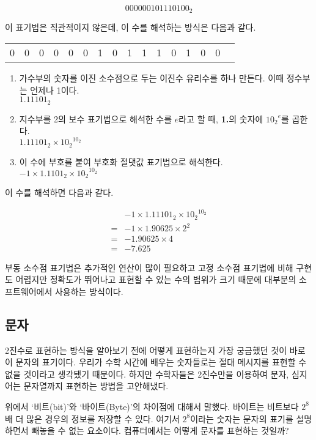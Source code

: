 \documentclass{article}
\begin{document}
$$
0 0000010 1110100_2
$$

이 표기법은 직관적이지 않은데, 이 수를 해석하는 방식은 다음과 같다.

\begin{center}
    \begin{tabular}{c|ccccccc|cccccccc}
        0 & 0 & 0 & 0 & 0 & 0 & 1 & 0 & 1 & 1 & 1 & 0 & 1 & 0 & 0
    \end{tabular}
\end{center}

\begin{enumerate}
    \item 가수부의 숫자를 이진 소수점으로 두는 이진수 유리수를 하나 만든다. 이때 정수부는 언제나 1이다. \\
          $1.11101_2$
    \item 지수부를 2의 보수 표기법으로 해석한 수를 $e$라고 할 때, \textbf{1.}의 숫자에 ${10_2}^e$를 곱한다. \\
          $1.11101_2 \times {10_2}^{10_2}$
    \item 이 수에 부호를 붙여 부호화 절댓값 표기법으로 해석한다. \\
          $-1 \times 1.1101_2 \times {10_2}^{10_2}$
\end{enumerate}

이 수를 해석하면 다음과 같다.

$$
\begin{aligned}
     & -1 \times 1.11101_2 \times {10_2}^{10_2} \\
    =& -1 \times 1.90625 \times 2^2 \\
    =& -1.90625 \times 4 \\
    =& -7.625
\end{aligned}
$$

부동 소수점 표기법은 추가적인 연산이 많이 필요하고 고정 소수점 표기법에 비해 구현도 어렵지만
정확도가 뛰어나고 표현할 수 있는 수의 범위가 크기 때문에
대부분의 소프트웨어에서 사용하는 방식이다.

\subsection{문자}

2진수로 표현하는 방식을 알아보기 전에 어떻게 표현하는지 가장 궁금했던 것이 바로 이 문자의
표기이다. 우리가 수학 시간에 배우는 숫자들로는 절대 메시지를 표현할 수 없을 것이라고 생각됐기
때문이다. 하지만 수학자들은 2진수만을 이용하여 문자, 심지어는 문자열까지 표현하는 방법을
고안해냈다.

위에서 `비트(bit)'와 `바이트(Byte)'의 차이점에 대해서 말했다. 바이트는 비트보다 $2^8$배 더
많은 경우의 정보를 저장할 수 있다. 여기서 $2^8$이라는 숫자는 문자의 표기를 설명하면서 빼놓을
수 없는 요소이다. 컴퓨터에서는 어떻게 문자를 표현하는 것일까?
\end{document}
